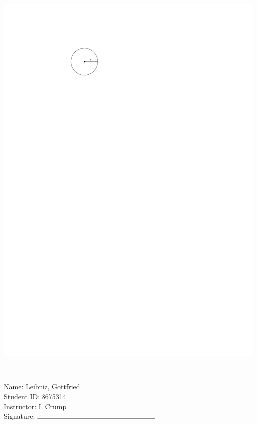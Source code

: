 \documentclass[12pt]{amsart}
\begin{document}
\begin{enumerate}
\includegraphics[scale = 0.8]{circle}

\vspace{1cm}
\newpage  $ $   \newpage\end{enumerate}\graphicspath{{C:/Users/iainc/anaconda3/Randomizer/Sample Course/Sample Assessment/}}\setcounter{page}{1}


\thispagestyle{fancy}

 \noindent Name: Leibniz, Gottfried \vspace{.3cm} \\\noindent Student ID: 8675314 \vspace{.3cm} \\\noindent Instructor: I. Crump \vspace{.3cm} \\\noindent Signature: $\rule{6cm}{0.15mm}$ \vspace{.3cm} \\ 
\end{document}
